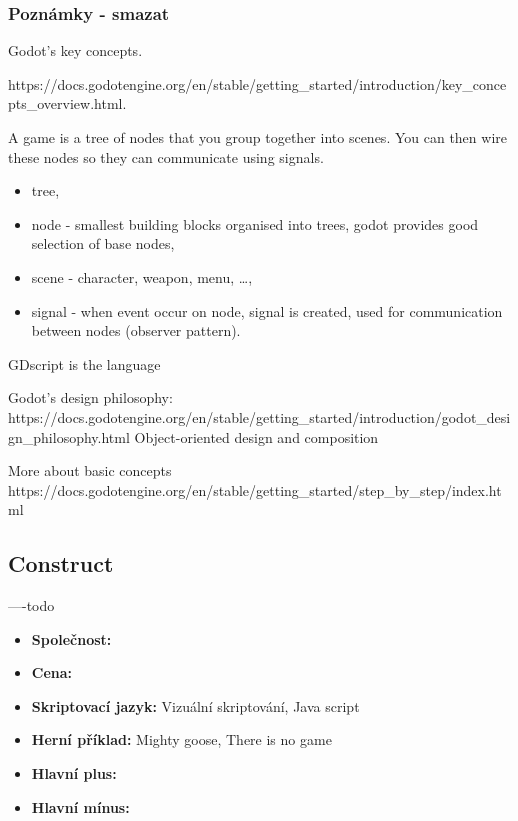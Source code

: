 \subsubsection{Poznámky - smazat}
Godot's key concepts.

https://docs.godotengine.org/en/stable/getting\_started/introduction/key\_concepts\_overview.html.

A game is a tree of nodes that you group together into scenes. You can then wire these nodes so they can communicate using signals.

\begin{itemize}
	\item tree,
	\item node - smallest building blocks organised into trees, godot provides good selection of base nodes,
	\item scene - character, weapon, menu, \ldots,
	\item  signal - when event occur on node, signal is created, used for communication between nodes (observer pattern).
\end{itemize}

GDscript is the language

Godot's design philosophy:
https://docs.godotengine.org/en/stable/getting\_started/introduction/godot\_design\_philosophy.html
Object-oriented design and composition

More about basic concepts
https://docs.godotengine.org/en/stable/getting\_started/step\_by\_step/index.html

\subsection{Construct}
----todo \linebreak
{}

\begin{itemize}
	\item \textbf{Společnost: }
	\item \textbf{Cena: }
	\item \textbf{Skriptovací jazyk: }  Vizuální skriptování, Java script
	\item \textbf{Herní příklad: } Mighty goose, There is no game
	\item \textbf{Hlavní plus: }
	\item \textbf{Hlavní mínus: }
\end{itemize}

